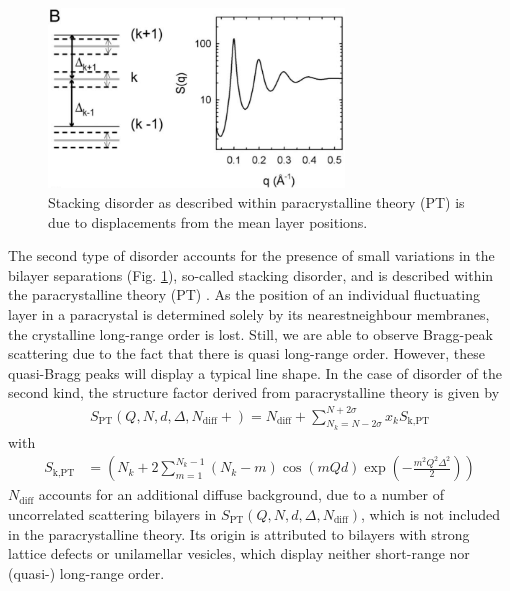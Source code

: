 \begin{figure}[htb]
\begin{center}
\includegraphics[width=0.7\textwidth,height=0.4\textwidth]{ParacrystallineTheorySQ.png}
\end{center}
\caption{Stacking disorder as described within paracrystalline
theory (PT) is due to displacements from the mean layer
positions.} \label{ParacrystallineTheorySQ}
\end{figure}


The second type of disorder accounts for the presence of small
variations in the bilayer separations (Fig.
\ref{ParacrystallineTheorySQ}), so-called stacking disorder, and is
described within the paracrystalline theory (PT)
\cite{Hosemann1962,Guinier1963,Blaurock1982}. As the position of an
individual fluctuating layer in a paracrystal is determined solely
by its nearestneighbour membranes, the crystalline long-range order
is lost. Still, we are able to observe Bragg-peak scattering due to
the fact that there is quasi long-range order. However, these
quasi-Bragg peaks will display a typical line shape. In the case of
disorder of the second kind, the structure factor derived from
paracrystalline theory is given by \cite{Guinier1963}
\begin{align}
S_\text{PT}(Q,N,d,\Delta,N_\text{diff}+) = N_\text{diff}+\sum_{N_k=N-2\sigma}^{N+2\sigma} x_k
S_\text{k,PT}
\end{align}
with
\begin{align}
S_\text{k,PT} &= \left( N_k + 2 \sum_{m=1}^{N_k-1} (N_k-m)
\cos(mQd) \exp\left( -\frac{m^2Q^2\Delta^2}{2}\right) \right)
\end{align}
$N_\text{diff}$ accounts for an additional
diffuse background, due to a number of uncorrelated
scattering bilayers in $S_\text{PT}(Q,N,d,\Delta,N_\text{diff})$,
which is not included in the paracrystalline theory.
Its origin is attributed to bilayers with strong lattice defects or
unilamellar vesicles, which display neither short-range nor
(quasi-) long-range order.

